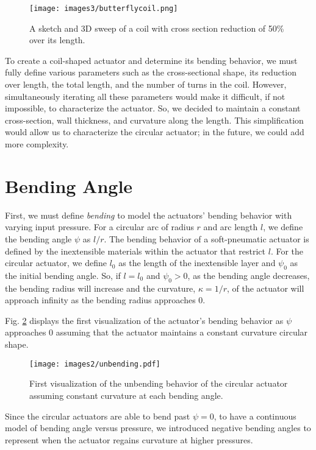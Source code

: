 \begin{figure}[ht]
    \centering
    \texttt{[image: images3/butterflycoil.png]}
    \caption{A sketch and 3D sweep of a coil with cross section reduction of 50\% over its length.}
    \label{fig:butterflycoil}
\end{figure}

To create a coil-shaped actuator and determine its bending behavior, we must fully define various parameters such as the cross-sectional shape, its reduction over length, the total length, and the number of turns in the coil. However, simultaneously iterating all these parameters would make it difficult, if not impossible, to characterize the actuator. So, we decided to maintain a constant cross-section, wall thickness, and curvature along the length. This simplification would allow us to characterize the circular actuator; in the future, we could add more complexity. 

\section{Bending Angle}

First, we must define \emph{bending} to model the actuators' bending behavior with varying input pressure. For a circular arc of radius $r$ and arc length $l$, we define the bending angle $\psi$ as $l/r$. The bending behavior of a soft-pneumatic actuator is defined by the inextensible materials within the actuator that restrict $l$. For the circular actuator, we define $l_{0}$ as the length of the inextensible layer and $\psi_0$ as the initial bending angle. So, if $l=l_0$ and $\psi_0>0$, as the bending angle decreases, the bending radius will increase and the curvature, $\kappa=1/r$, of the actuator will approach infinity as the bending radius approaches 0. 

Fig. \ref{fig:unbending} displays the first visualization of the actuator's bending behavior as $\psi$ approaches $0$ assuming that the actuator maintains a constant curvature circular shape. 
\\
\begin{figure}[ht]
    \centering
    \texttt{[image: images2/unbending.pdf]}
    \caption{First visualization of the unbending behavior of the circular actuator assuming constant curvature at each bending angle.}
    \label{fig:unbending}
\end{figure}

Since the circular actuators are able to bend past $\psi=0$, to have a continuous model of bending angle versus pressure, we introduced negative bending angles to represent when the actuator regains curvature at higher pressures. 

